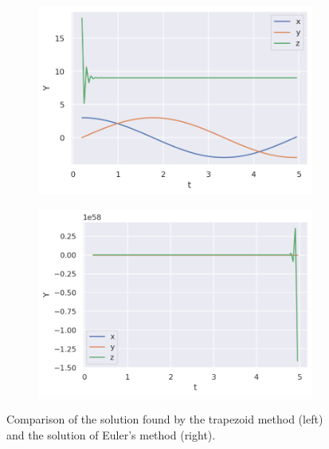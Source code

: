 \documentclass[12pt]{article}
\begin{document}
\begin{figure}[h]
\centering
\begin{subfigure}{.5\linewidth}
  \centering
  \includegraphics[width=\linewidth]{trapezoid.png}
\end{subfigure}%
\begin{subfigure}{.5\linewidth}
  \centering
  \includegraphics[width=\linewidth]{euler.png}
\end{subfigure}
\caption{Comparison of the solution found by the trapezoid method (left) and the solution of Euler's method (right).}
\end{figure}
\end{document}
